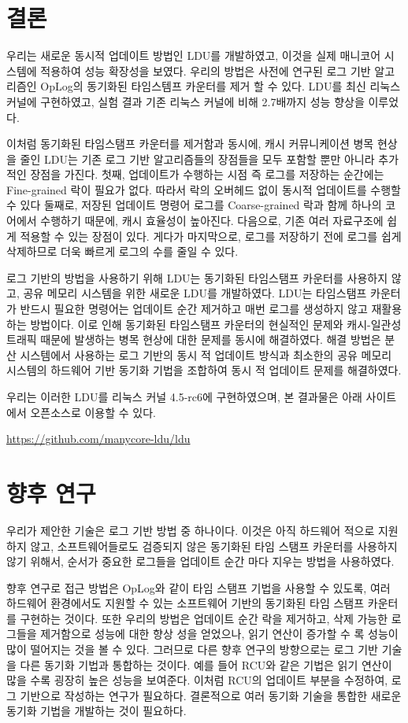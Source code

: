 
\section{결론}

우리는 새로운 동시적 업데이트 방법인 LDU를 개발하였고, 
이것을 실제 매니코어 시스템에 적용하여 성능 확장성을 보였다.
우리의 방법은 사전에 연구된 로그 기반 알고리즘인 OpLog의 동기화된 타임스템프 카운터를 제거 할 수 있다. 
LDU를 최신 리눅스 커널에 구현하였고, 실험 결과 기존 리눅스 커널에 비해 2.7배까지 성능 향상을 이루었다. 

이처럼 동기화된 타임스탬프 카운터를 제거함과 동시에, 캐시 커뮤니케이션 병목 현상을 줄인
LDU는 기존 로그 기반 알고리즘들의 장점들을 모두 포함할 뿐만 아니라 추가적인 장점을 가진다.
첫째, 업데이트가 수행하는 시점 즉 로그를 저장하는 순간에는 Fine-grained 락이 필요가 없다.
따라서 락의 오버헤드 없이 동시적 업데이트를 수행할 수 있다
둘째로, 저장된 업데이트 명령어 로그를 Coarse-grained 락과 함께 하나의 코어에서 수행하기 때문에, 
캐시 효율성이 높아진다.
다음으로, 기존 여러 자료구조에 쉽게 적용할 수 있는 장점이 있다.
게다가 마지막으로, 로그를 저장하기 전에 로그를 쉽게 삭제하므로 더욱 빠르게 로그의 수를 줄일 수 있다. 

로그 기반의 방법을 사용하기 위해 LDU는 동기화된 타임스탬프 카운터를 사용하지 않고,
공유 메모리 시스템을 위한 새로운 LDU를 개발하였다.
LDU는 타임스탬프 카운터가 반드시 필요한 명령어는 업데이트 순간 제거하고 매번 로그를 
생성하지 않고 재활용하는 방법이다.
이로 인해 동기화된 타임스탬프 카운터의 현실적인 문제와 캐시-일관성 트래픽 때문에 발생하는 
병목 현상에 대한 문제를 동시에 해결하였다.
해결 방법은 분산 시스템에서 사용하는 로그 기반의 
동시 적 업데이트 방식과 최소한의 공유 메모리 시스템의 하드웨어 기반 동기화 기법을 조합하여 동시 적 
업데이트 문제를 해결하였다.

우리는 이러한 LDU를 리눅스 커널 4.5-rc6에 구현하였으며, 본 결과물은
아래 사이트에서 오픈소스로 이용할 수 있다.
\begin{center}
\url{https://github.com/manycore-ldu/ldu}
\end{center}

\newpage
\section{향후 연구}

우리가 제안한 기술은 로그 기반 방법 중 하나이다. 
이것은 아직 하드웨어 적으로 지원하지 않고, 소프트웨어들로도 검증되지 않은 
동기화된 타임 스탬프 카운터를 사용하지 않기 위해서, 
순서가 중요한 로그들을 업데이트 순간 마다 지우는 방법을 사용하였다. 

향후 연구로 접근 방법은 OpLog와 같이 타임 스탬프 기법을 사용할 수 있도록, 
여러 하드웨어 환경에서도 지원할 수 있는 소프트웨어 기반의 동기화된 타임 스탬프 카운터를 구현하는 것이다.
또한 우리의 방법은 업데이트 순간 락을 제거하고, 삭제 가능한 로그들을 제거함으로 
성능에 대한 향상 성을 얻었으나, 읽기 연산이 증가할 수 록 성능이 많이 떨어지는 것을 볼 수 있다.
그러므로 다른 향후 연구의 방향으로는 로그 기반 기술을 다른 동기화 기법과 통합하는 것이다. 
예를 들어 RCU와 같은 기법은 읽기 연산이 많을 수록 굉장히 높은 성능을 보여준다.
이처럼 RCU의 업데이트 부분을 수정하여, 로그 기반으로 작성하는 연구가 필요하다.
결론적으로 여러 동기화 기술을 통합한 새로운 동기화 기법을 개발하는 것이 필요하다.

